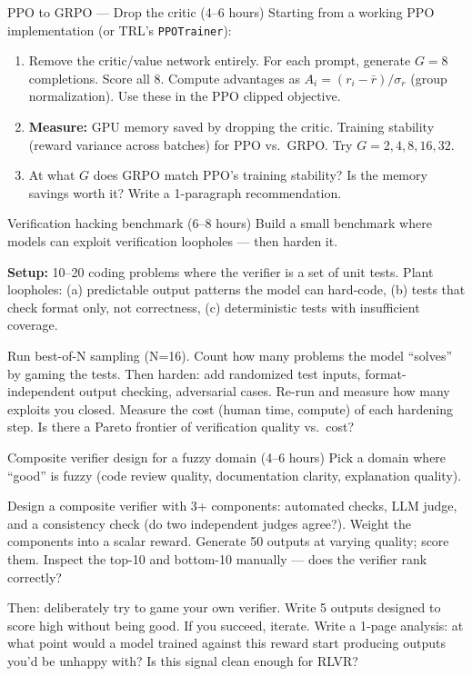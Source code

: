 \begin{exercise}{PPO to GRPO --- Drop the critic (4--6 hours)}
Starting from a working PPO implementation (or TRL's \texttt{PPOTrainer}):

\begin{enumerate}
  \item Remove the critic/value network entirely. For each prompt, generate $G = 8$ completions. Score all 8. Compute advantages as $A_i = (r_i - \bar{r})/\sigma_r$ (group normalization). Use these in the PPO clipped objective.
  \item \textbf{Measure:} GPU memory saved by dropping the critic. Training stability (reward variance across batches) for PPO vs.\ GRPO. Try $G = 2, 4, 8, 16, 32$.
  \item At what $G$ does GRPO match PPO's training stability? Is the memory savings worth it? Write a 1-paragraph recommendation.
\end{enumerate}
\end{exercise}

\begin{exercise}{Verification hacking benchmark (6--8 hours)}
Build a small benchmark where models can exploit verification loopholes --- then harden it.

\textbf{Setup:} 10--20 coding problems where the verifier is a set of unit tests. Plant loopholes: (a) predictable output patterns the model can hard-code, (b) tests that check format only, not correctness, (c) deterministic tests with insufficient coverage.

Run best-of-N sampling (N=16). Count how many problems the model ``solves'' by gaming the tests. Then harden: add randomized test inputs, format-independent output checking, adversarial cases. Re-run and measure how many exploits you closed. Measure the cost (human time, compute) of each hardening step. Is there a Pareto frontier of verification quality vs.\ cost?
\end{exercise}

\begin{exercise}{Composite verifier design for a fuzzy domain (4--6 hours)}
Pick a domain where ``good'' is fuzzy (code review quality, documentation clarity, explanation quality).

Design a composite verifier with 3+ components: automated checks, LLM judge, and a consistency check (do two independent judges agree?). Weight the components into a scalar reward. Generate 50 outputs at varying quality; score them. Inspect the top-10 and bottom-10 manually --- does the verifier rank correctly?

Then: deliberately try to game your own verifier. Write 5 outputs designed to score high without being good. If you succeed, iterate. Write a 1-page analysis: at what point would a model trained against this reward start producing outputs you'd be unhappy with? Is this signal clean enough for RLVR?
\end{exercise}

